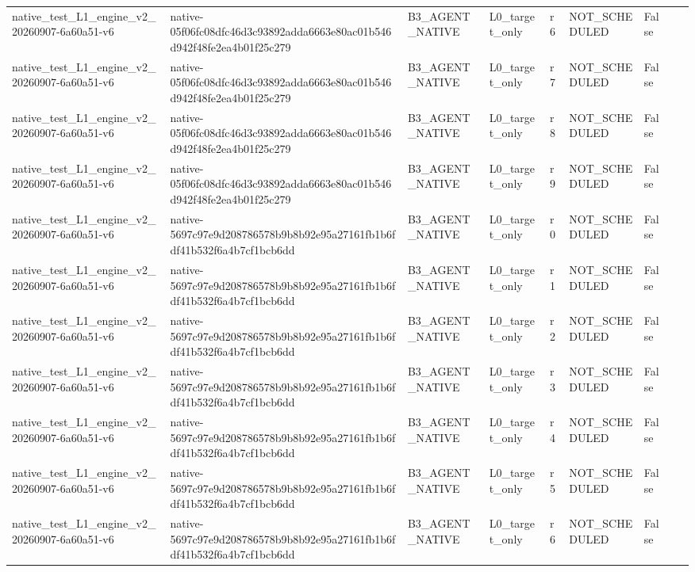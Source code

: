 \begin{tabular}{lllllllll}
native\_test\_L1\_engine\_v2\_20260907-6a60a51-v6 & native-05f06fc08dfc46d3c93892adda6663e80ac01b546d942f48fe2ea4b01f25c279 & B3\_AGENT\_NATIVE & L0\_target\_only & r6 & NOT\_SCHEDULED & False &  &  \\
native\_test\_L1\_engine\_v2\_20260907-6a60a51-v6 & native-05f06fc08dfc46d3c93892adda6663e80ac01b546d942f48fe2ea4b01f25c279 & B3\_AGENT\_NATIVE & L0\_target\_only & r7 & NOT\_SCHEDULED & False &  &  \\
native\_test\_L1\_engine\_v2\_20260907-6a60a51-v6 & native-05f06fc08dfc46d3c93892adda6663e80ac01b546d942f48fe2ea4b01f25c279 & B3\_AGENT\_NATIVE & L0\_target\_only & r8 & NOT\_SCHEDULED & False &  &  \\
native\_test\_L1\_engine\_v2\_20260907-6a60a51-v6 & native-05f06fc08dfc46d3c93892adda6663e80ac01b546d942f48fe2ea4b01f25c279 & B3\_AGENT\_NATIVE & L0\_target\_only & r9 & NOT\_SCHEDULED & False &  &  \\
native\_test\_L1\_engine\_v2\_20260907-6a60a51-v6 & native-5697c97e9d208786578b9b8b92e95a27161fb1b6fdf41b532f6a4b7cf1bcb6dd & B3\_AGENT\_NATIVE & L0\_target\_only & r0 & NOT\_SCHEDULED & False &  &  \\
native\_test\_L1\_engine\_v2\_20260907-6a60a51-v6 & native-5697c97e9d208786578b9b8b92e95a27161fb1b6fdf41b532f6a4b7cf1bcb6dd & B3\_AGENT\_NATIVE & L0\_target\_only & r1 & NOT\_SCHEDULED & False &  &  \\
native\_test\_L1\_engine\_v2\_20260907-6a60a51-v6 & native-5697c97e9d208786578b9b8b92e95a27161fb1b6fdf41b532f6a4b7cf1bcb6dd & B3\_AGENT\_NATIVE & L0\_target\_only & r2 & NOT\_SCHEDULED & False &  &  \\
native\_test\_L1\_engine\_v2\_20260907-6a60a51-v6 & native-5697c97e9d208786578b9b8b92e95a27161fb1b6fdf41b532f6a4b7cf1bcb6dd & B3\_AGENT\_NATIVE & L0\_target\_only & r3 & NOT\_SCHEDULED & False &  &  \\
native\_test\_L1\_engine\_v2\_20260907-6a60a51-v6 & native-5697c97e9d208786578b9b8b92e95a27161fb1b6fdf41b532f6a4b7cf1bcb6dd & B3\_AGENT\_NATIVE & L0\_target\_only & r4 & NOT\_SCHEDULED & False &  &  \\
native\_test\_L1\_engine\_v2\_20260907-6a60a51-v6 & native-5697c97e9d208786578b9b8b92e95a27161fb1b6fdf41b532f6a4b7cf1bcb6dd & B3\_AGENT\_NATIVE & L0\_target\_only & r5 & NOT\_SCHEDULED & False &  &  \\
native\_test\_L1\_engine\_v2\_20260907-6a60a51-v6 & native-5697c97e9d208786578b9b8b92e95a27161fb1b6fdf41b532f6a4b7cf1bcb6dd & B3\_AGENT\_NATIVE & L0\_target\_only & r6 & NOT\_SCHEDULED & False &  &  \\

\end{tabular}
